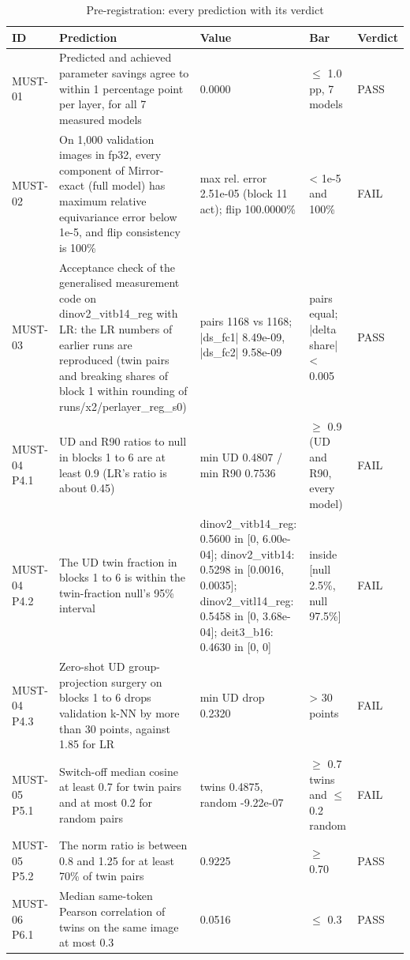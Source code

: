 \begin{table}[t]
\centering
\small
\caption{Pre-registration: every prediction with its verdict}
\label{tab:appendix_a3_prereg}
\begin{tabular}{lllll}
\toprule
ID & Prediction & Value & Bar & Verdict \\
\midrule
MUST-01 & Predicted and achieved parameter savings agree to within 1 percentage point per layer, for all 7 measured models & 0.0000 & $\le$ 1.0 pp, 7 models & PASS \\
MUST-02 & On 1,000 validation images in fp32, every component of Mirror-exact (full model) has maximum relative equivariance error below 1e-5, and flip consistency is 100\% & max rel. error 2.51e-05 (block 11 act); flip 100.0000\% & < 1e-5 and 100\% & FAIL \\
MUST-03 & Acceptance check of the generalised measurement code on dinov2\_vitb14\_reg with LR: the LR numbers of earlier runs are reproduced (twin pairs and breaking shares of block 1 within rounding of runs/x2/perlayer\_reg\_s0) & pairs 1168 vs 1168; |ds\_fc1| 8.49e-09, |ds\_fc2| 9.58e-09 & pairs equal; |delta share| < 0.005 & PASS \\
MUST-04 P4.1 & UD and R90 ratios to null in blocks 1 to 6 are at least 0.9 (LR's ratio is about 0.45) & min UD 0.4807 / min R90 0.7536 & $\ge$ 0.9 (UD and R90, every model) & FAIL \\
MUST-04 P4.2 & The UD twin fraction in blocks 1 to 6 is within the twin-fraction null's 95\% interval & dinov2\_vitb14\_reg: 0.5600 in [0, 6.00e-04]; dinov2\_vitb14: 0.5298 in [0.0016, 0.0035]; dinov2\_vitl14\_reg: 0.5458 in [0, 3.68e-04]; deit3\_b16: 0.4630 in [0, 0] & inside [null 2.5\%, null 97.5\%] & FAIL \\
MUST-04 P4.3 & Zero-shot UD group-projection surgery on blocks 1 to 6 drops validation k-NN by more than 30 points, against 1.85 for LR & min UD drop 0.2320 & > 30 points & FAIL \\
MUST-05 P5.1 & Switch-off median cosine at least 0.7 for twin pairs and at most 0.2 for random pairs & twins 0.4875, random -9.22e-07 & $\ge$ 0.7 twins and $\le$ 0.2 random & FAIL \\
MUST-05 P5.2 & The norm ratio is between 0.8 and 1.25 for at least 70\% of twin pairs & 0.9225 & $\ge$ 0.70 & PASS \\
MUST-06 P6.1 & Median same-token Pearson correlation of twins on the same image at most 0.3 & 0.0516 & $\le$ 0.3 & PASS \\

\end{tabular}
\end{table}
